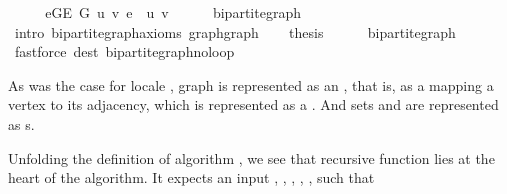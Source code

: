 \begin{isabellebody}
\endisataginvisible
{\isafoldinvisible}%
%
\isadeliminvisible
\isanewline
%
\endisadeliminvisible
%
\isadelimproof
%
\endisadelimproof
%
\isatagproof
{}\isamarkupfalse%
\ {\isacharminus}{\kern0pt}\isanewline
\ \ \isamarkupfalse%
\ {\isachardoublequoteopen}{\isasymforall}e{\isasymin}G{\isachardot}{\kern0pt}E\ G{\isachardot}{\kern0pt}\ {\isasymexists}u\ v{\isachardot}{\kern0pt}\ e\ {\isacharequal}{\kern0pt}\ {\isacharbraceleft}{\kern0pt}u{\isacharcomma}{\kern0pt}\ v{\isacharbraceright}{\kern0pt}{\isachardoublequoteclose}\isanewline
\ \ \ \ \isamarkupfalse%
\ bipartite{\isacharunderscore}{\kern0pt}graph\isanewline
\ \ \ \ \isamarkupfalse%
\ {\isacharparenleft}{\kern0pt}intro\ bipartite{\isacharunderscore}{\kern0pt}graph{\isachardot}{\kern0pt}axioms{\isacharparenleft}{\kern0pt}{}{\isacharparenright}{\kern0pt}\ graph{\isachardot}{\kern0pt}graph{\isacharparenright}{\kern0pt}\isanewline
\ \ \isamarkupfalse%
\ {\isacharquery}{\kern0pt}thesis\isanewline
\ \ \ \ \isamarkupfalse%
\ bipartite{\isacharunderscore}{\kern0pt}graph\isanewline
\ \ \ \ \isamarkupfalse%
\ {\isacharparenleft}{\kern0pt}fastforce\ dest{\isacharcolon}{\kern0pt}\ bipartite{\isacharunderscore}{\kern0pt}graph{\isachardot}{\kern0pt}no{\isacharunderscore}{\kern0pt}loop{\isacharparenright}{\kern0pt}\isanewline
{}\isamarkupfalse%
%
\endisatagproof
{\isafoldproof}%
%
\isadelimproof
%
\endisadelimproof
%
\begin{isamarkuptext}%
As was the case for locale , graph  is represented as an
, that is, as a  mapping a vertex to its adjacency, which
is represented as a . And sets  and  are represented as
s.%
\end{isamarkuptext}\isamarkuptrue%
%
\isadelimdocument
%
\endisadelimdocument
%
\isatagdocument
%
\isamarkuptrue%
%
\endisatagdocument
{\isafolddocument}%
%
\isadelimdocument
%
\endisadelimdocument
%
\begin{isamarkuptext}%
Unfolding the definition of algorithm , we see that recursive
function  lies at the heart of the algorithm. It expects an input
, , , , ,  such that


\end{isamarkuptext}
\end{isabellebody}
